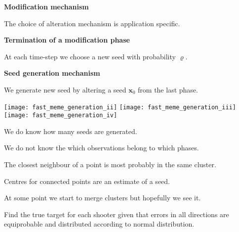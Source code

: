 \documentclass[landscape,footrule]{foils}
\renewcommand{\vec}[1]{\boldsymbol{#1}}
\begin{document}
\textbf{Modification mechanism}
\begin{triangles}
\item The choice of alteration mechanism is application specific.\vspace*{2ex} 
\end{triangles}

\textbf{Termination of a modification phase}
\begin{triangles}
\item At each time-step we choose a new seed with probability $\varrho$.\vspace*{2ex} 
\end{triangles}

\textbf{Seed generation mechanism}
\begin{triangles}
\item We generate new seed by altering a seed $\vec{x}_0$ from the last phase.\vspace*{1ex} 
\end{triangles}


\centerline{
\texttt{[image: fast\_meme\_generation\_ii]}
\texttt{[image: fast\_meme\_generation\_iii]}
\texttt{[image: fast\_meme\_generation\_iv]}}

\begin{triangles}
\item We do know how many seeds are generated.
\item We do not know the which observations belong to which phases.
\item The closest neighbour of a point is most probably in the same cluster.
\item Centres for connected points are an estimate of a seed.
\item At some point we start to merge clusters but hopefully we see it.
\end{triangles}





Find the true target for each shooter given that errors in all directions are equiprobable and distributed according to normal distribution.\vspace*{-1cm}

\end{document}
